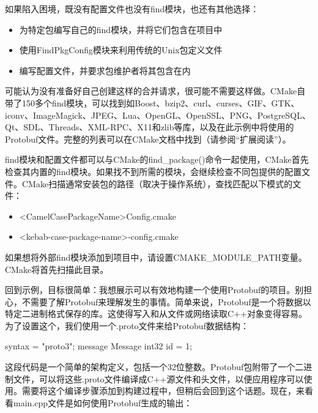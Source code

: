 如果陷入困境，既没有配置文件也没有find模块，也还有其他选择：

\begin{itemize}
\item
为特定包编写自己的find模块，并将它们包含在项目中

\item
使用FindPkgConfig模块来利用传统的Unix包定义文件

\item
编写配置文件，并要求包维护者将其包含在内
\end{itemize}

可能认为没有准备好自己创建这样的合并请求，很可能不需要这样做。CMake自带了150多个find模块，可以找到如Boost、bzip2、curl、curses、GIF、GTK、iconv、ImageMagick、JPEG、Lua、OpenGL、OpenSSL、PNG、PostgreSQL、Qt、SDL、Threads、XML-RPC、X11和zlib等库，以及在此示例中将使用的Protobuf文件。完整的列表可以在CMake文档中找到（请参阅“扩展阅读”）。

find模块和配置文件都可以与CMake的find\_package()命令一起使用，CMake首先检查其内置的find模块。如果找不到所需的模块，会继续检查不同包提供的配置文件。CMake扫描通常安装包的路径（取决于操作系统），查找匹配以下模式的文件：

\begin{itemize}
\item
<CamelCasePackageName>Config.cmake

\item
<kebab-case-package-name>-config.cmake
\end{itemize}

如果想将外部find模块添加到项目中，请设置CMAKE\_MODULE\_PATH变量。CMake将首先扫描此目录。

回到示例，目标很简单：我想展示可以有效地构建一个使用Protobuf的项目。别担心，不需要了解Protobuf来理解发生的事情。简单来说，Protobuf是一个将数据以特定二进制格式保存的库。这使得写入和从文件或网络读取C++对象变得容易。为了设置这个，我们使用一个.proto文件来给Protobuf数据结构：


\begin{shell}
syntax = "proto3";
message Message {
    int32 id = 1;
}
\end{shell}

这段代码是一个简单的架构定义，包括一个32位整数。Protobuf包附带了一个二进制文件，可以将这些.proto文件编译成C++源文件和头文件，以便应用程序可以使用。需要将这个编译步骤添加到构建过程中，但稍后会回到这个话题。现在，来看看main.cpp文件是如何使用Protobuf生成的输出：

